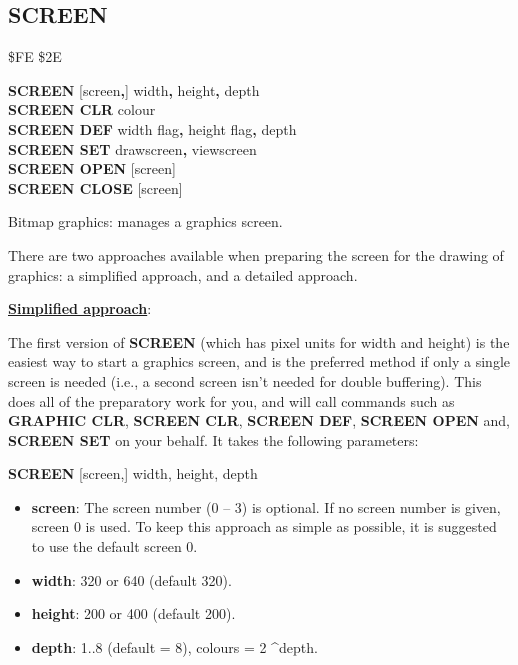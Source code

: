 \subsection{SCREEN}
\begin{description}[leftmargin=2cm,style=nextline]
\item [Token:]    \$FE \$2E

\item [Format:]   {\bf SCREEN} [screen{\bf,}] width{\bf,} height{\bf,} depth \\
                  {\bf SCREEN CLR} colour \\
                  {\bf SCREEN DEF} width flag{\bf,} height flag{\bf,} depth \\
                  {\bf SCREEN SET} drawscreen{\bf,} viewscreen \\
                  {\bf SCREEN OPEN} [screen] \\
                  {\bf SCREEN CLOSE} [screen]

\item [Usage:]    Bitmap graphics: manages a graphics screen.

                  There are two approaches available when preparing the screen for the drawing of graphics: a simplified approach, and a detailed approach.

                  \underline{{\bf Simplified approach}}:

                  The first version of {\bf SCREEN} (which has pixel units for width and height) is the easiest               way to start a graphics screen, and is the preferred method if only a single screen is needed (i.e., a second screen isn't needed for double buffering). This does all of the preparatory work for you, and will call commands such as {\bf GRAPHIC CLR}, {\bf SCREEN CLR}, {\bf SCREEN DEF}, {\bf SCREEN OPEN} and, {\bf SCREEN SET} on your behalf. It takes the following parameters:

                  {\bf SCREEN} [screen,] width, height, depth

                  \begin{itemize}
                     \item {\bf screen}: The screen number (0 -- 3) is optional. If no screen number is given, screen 0 is used. To keep this approach as simple as possible, it is suggested to use the default screen 0.
                     \item {\bf width}: 320 or 640 (default 320).
                     \item {\bf height}: 200 or 400 (default 200).
                     \item {\bf depth}: 1..8 (default = 8), colours = 2 \textasciicircum depth.
                  \end{itemize}


\end{description}
